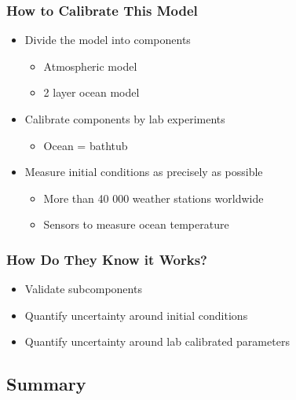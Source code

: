 \documentclass[11pt]{beamer}
\begin{document}
\begin{frame}[c]\frametitle{How to Calibrate This Model}
    \begin{itemize}
        \item Divide the model into components
        \begin{itemize}
            \item Atmospheric model
            \item 2 layer ocean model
        \end{itemize}
        \item Calibrate components by lab experiments
        \begin{itemize}
            \item Ocean = bathtub
        \end{itemize}
        \item Measure initial conditions as precisely as possible
        \begin{itemize}
            \item More than 40 000 weather stations worldwide
            \item Sensors to measure ocean temperature
        \end{itemize}
    \end{itemize}
\end{frame}


\begin{frame}[c]\frametitle{How Do They Know it Works?}
    \begin{itemize}
        \item Validate subcomponents
        \item Quantify uncertainty around initial conditions
        \item Quantify uncertainty around lab calibrated parameters
    \end{itemize}
\end{frame}


\subsection{Summary}
\end{document}
